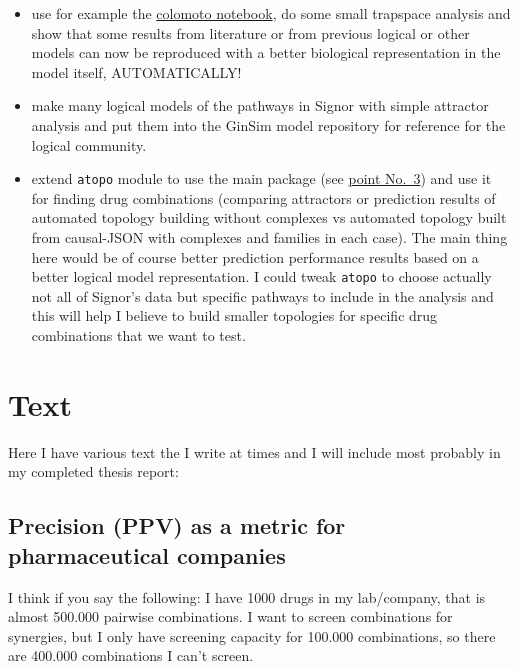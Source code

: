 \documentclass[
  12pt,
]{book}
\providecommand{\tightlist}{%
  \setlength{\itemsep}{0pt}\setlength{\parskip}{0pt}}
\begin{document}
\begin{enumerate}
  \begin{itemize}
  \tightlist
  \item
    use for example the \href{https://github.com/colomoto/colomoto-docker}{colomoto notebook}, do some small trapspace analysis and show that some results from literature or from previous logical or other models can now be reproduced with a better biological representation in the model itself, AUTOMATICALLY!
  \item
    make many logical models of the pathways in Signor with simple attractor analysis and put them into the GinSim model repository for reference for the logical community.
  \item
    extend \texttt{atopo} module to use the main package (see \protect\hyperlink{causalJSONPoint3}{point No.~3}) and use it for finding drug combinations (comparing attractors or prediction results of automated topology building without complexes vs automated topology built from causal-JSON with complexes and families in each case).
    The main thing here would be of course better prediction performance results based on a better logical model representation.
    I could tweak \texttt{atopo} to choose actually not all of Signor's data but specific pathways to include in the analysis and this will help I believe to build smaller topologies for specific drug combinations that we want to test.
  \end{itemize}
\end{enumerate}

\hypertarget{text}{%
\chapter{Text}\label{text}}

Here I have various text the I write at times and I will include most probably in my completed thesis report:

\hypertarget{precision-ppv-as-a-metric-for-pharmaceutical-companies}{%
\section*{Precision (PPV) as a metric for pharmaceutical companies}\label{precision-ppv-as-a-metric-for-pharmaceutical-companies}}

I think if you say the following: I have 1000 drugs in my lab/company, that is almost 500.000 pairwise combinations.
I want to screen combinations for synergies, but I only have screening capacity for 100.000 combinations, so there are 400.000 combinations I can't screen.
\end{document}

